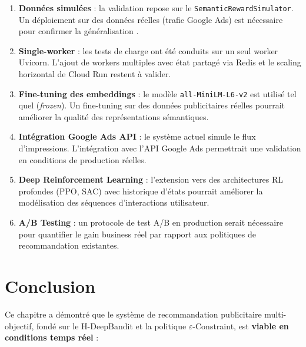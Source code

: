 \begin{enumerate}
    \item \textbf{Données simulées} : la validation repose sur le \texttt{SemanticRewardSimulator}. Un déploiement sur des données réelles (trafic Google Ads) est nécessaire pour confirmer la généralisation \parencite{chapelle2014simple}.

    \item \textbf{Single-worker} : les tests de charge ont été conduits sur un seul worker Uvicorn. L'ajout de workers multiples avec état partagé via Redis et le scaling horizontal de Cloud Run restent à valider.

    \item \textbf{Fine-tuning des embeddings} : le modèle \texttt{all-MiniLM-L6-v2} \parencite{reimers2019sentence} est utilisé tel quel (\textit{frozen}). Un fine-tuning sur des données publicitaires réelles pourrait améliorer la qualité des représentations sémantiques.

    \item \textbf{Intégration Google Ads API} : le système actuel simule le flux d'impressions. L'intégration avec l'API Google Ads permettrait une validation en conditions de production réelles.

    \item \textbf{Deep Reinforcement Learning} : l'extension vers des architectures RL profondes (PPO, SAC) avec historique d'états pourrait améliorer la modélisation des séquences d'interactions utilisateur.

    \item \textbf{A/B Testing} : un protocole de test A/B en production serait nécessaire pour quantifier le gain business réel par rapport aux politiques de recommandation existantes.
\end{enumerate}


\section*{Conclusion}

Ce chapitre a démontré que le système de recommandation publicitaire multi-objectif, fondé sur le H-DeepBandit et la politique $\varepsilon$-Constraint, est \textbf{viable en conditions temps réel} :

